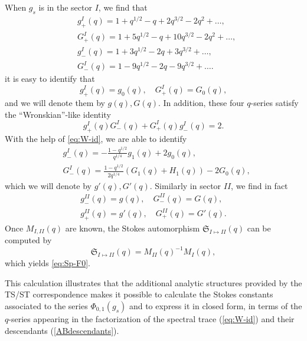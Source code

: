 \documentclass[a4paper,11pt]{article}
\theoremstyle{definition}
\newcommand{\nn}{\nonumber \\}
\def\mf{\mathfrak}
\begin{document}
When $g_s$ is in the sector $I$, we find that
\begin{subequations}
  \begin{align}
    &g_+^I(q) = 1+q^{1/2} - q + 2q^{3/2}- 2q^2 + \ldots,\\
    &G_+^I(q) = 1+5q^{1/2} - q + 10q^{3/2}- 2q^2 + \ldots,\\
    &g_-^I(q) = 1+3q^{1/2} - 2q + 3q^{3/2} +\ldots,\\
    &G_-^I(q) = 1-9q^{1/2} - 2q - 9q^{3/2} +\ldots.
  \end{align}
\end{subequations}
it is easy to identify that
\begin{equation}
  g_+^I(q) = g_0(q),\quad G_+^I(q) = G_0(q),
  \label{eq:gG}
\end{equation}
and we will denote them by $g(q), G(q)$.
In addition, these four $q$-series satisfy the ``Wronskian''-like
identity
\begin{equation}
  g_+^I(q) G_-^I(q) + G_+^I(q)g_-^I (q) = 2.
\end{equation}
With the help of \eqref{eq:W-id}, we are able to identify
\begin{subequations}
  \begin{align}
    &g_-^I(q) = -\frac{1-q^{1/2}}{q^{1/4}}g_1(q) + 2 g_0(q),
    \label{eq:gprime}\\
    &G_-^I(q) = \frac{1-q^{1/2}}{2q^{1/4}}(G_1(q)+H_1(q)) - 2 G_0(q), 
      \label{eq:Gprime}
  \end{align}
\end{subequations}
%
which we will denote by $g'(q), G'(q)$.
Similarly in sector $II$, we find in fact
%
\begin{gather}
  g_-^{II}(q) = g(q),\quad G_-^{II}(q) = G(q),\nn
  g_+^{II}(q) = g'(q),\quad G_+^{II}(q) = G'(q).
\end{gather}
%
Once $M_{I,II}(q)$ are known, the Stokes automorphism
$\mf{S}_{I\mapsto II}(q)$ can be computed by
\begin{equation}
  \mf{S}_{I\mapsto II}(q) = M_{II}(q)^{-1} M_I(q), 
\end{equation}
which yields \eqref{eq:Sp-F0}. 

This calculation illustrates that the additional analytic structures provided by the TS/ST correspondence makes it possible 
to calculate the Stokes constants associated to the series $\Phi_{0,1}(g_s)$ and to express it in closed form, in terms of the $q$-series appearing 
in the factorization of the spectral trace (\ref{eq:W-id}) and their descendants (\ref{ABdescendants}). 
\end{document}
